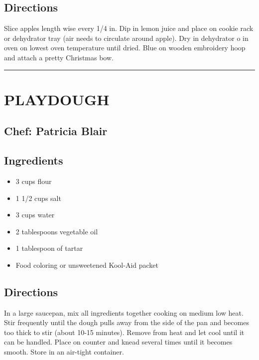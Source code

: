 \documentclass[
]{book}
\providecommand{\tightlist}{%
  \setlength{\itemsep}{0pt}\setlength{\parskip}{0pt}}
\begin{document}
\hypertarget{directions-118}{%
\subsection*{Directions}\label{directions-118}}


Slice apples length wise every 1/4 in. Dip in lemon juice and place on cookie rack or dehydrator tray (air needs to circulate around apple). Dry in dehydrator o in oven on lowest oven temperature until dried. Blue on wooden embroidery hoop and attach a pretty Christmas bow.

\begin{center}\rule{0.5\linewidth}{0.5pt}\end{center}

\hypertarget{playdough}{%
\section*{PLAYDOUGH}\label{playdough}}


\hypertarget{chef-patricia-blair-22}{%
\subsection*{Chef: Patricia Blair}\label{chef-patricia-blair-22}}


\hypertarget{ingredients-119}{%
\subsection*{Ingredients}\label{ingredients-119}}


\begin{itemize}
\tightlist
\item
  3 cups flour
\item
  1 1/2 cups salt
\item
  3 cups water
\item
  2 tablespoons vegetable oil
\item
  1 tablespoon of tartar
\item
  Food coloring or unsweetened Kool-Aid packet
\end{itemize}

\hypertarget{directions-119}{%
\subsection*{Directions}\label{directions-119}}


In a large saucepan, mix all ingredients together cooking on medium low heat. Stir frequently until the dough pulls away from the side of the pan and becomes too thick to stir (about 10-15 minutes). Remove from heat and let cool until it can be handled. Place on counter and knead several times until it becomes smooth. Store in an air-tight container.
\end{document}
